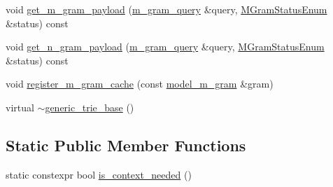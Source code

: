 \begin{DoxyCompactItemize}
\item 
void \hyperlink{classuva_1_1smt_1_1bpbd_1_1server_1_1lm_1_1generic__trie__base_a7169867c7fa2574dd8b6a03fb30339d2}{get\+\_\+m\+\_\+gram\+\_\+payload} (\hyperlink{classuva_1_1smt_1_1bpbd_1_1server_1_1lm_1_1m__gram__query}{m\+\_\+gram\+\_\+query} \&query, \hyperlink{namespaceuva_1_1smt_1_1bpbd_1_1server_1_1lm_ab9b3e7382b561dcb8abcd6b55e9b796a}{M\+Gram\+Status\+Enum} \&status) const 
\item 
void \hyperlink{classuva_1_1smt_1_1bpbd_1_1server_1_1lm_1_1generic__trie__base_aaf7ba4de7f980e7e37c297caabc71ad7}{get\+\_\+n\+\_\+gram\+\_\+payload} (\hyperlink{classuva_1_1smt_1_1bpbd_1_1server_1_1lm_1_1m__gram__query}{m\+\_\+gram\+\_\+query} \&query, \hyperlink{namespaceuva_1_1smt_1_1bpbd_1_1server_1_1lm_ab9b3e7382b561dcb8abcd6b55e9b796a}{M\+Gram\+Status\+Enum} \&status) const 
\item 
void \hyperlink{classuva_1_1smt_1_1bpbd_1_1server_1_1lm_1_1generic__trie__base_aca43a446218a34804a37f20eb5d36294}{register\+\_\+m\+\_\+gram\+\_\+cache} (const \hyperlink{classuva_1_1smt_1_1bpbd_1_1server_1_1lm_1_1m__grams_1_1model__m__gram}{model\+\_\+m\+\_\+gram} \&gram)
\item 
virtual \hyperlink{classuva_1_1smt_1_1bpbd_1_1server_1_1lm_1_1generic__trie__base_a192f7e1e6ec4dcf2a4b8f502e345a4bc}{$\sim$generic\+\_\+trie\+\_\+base} ()
\end{DoxyCompactItemize}
\subsection*{Static Public Member Functions}
\begin{DoxyCompactItemize}
\item 
static constexpr bool \hyperlink{classuva_1_1smt_1_1bpbd_1_1server_1_1lm_1_1generic__trie__base_aa252ed28813e9c1fa010ea662f1fc09d}{is\+\_\+context\+\_\+needed} ()
\end{DoxyCompactItemize}
